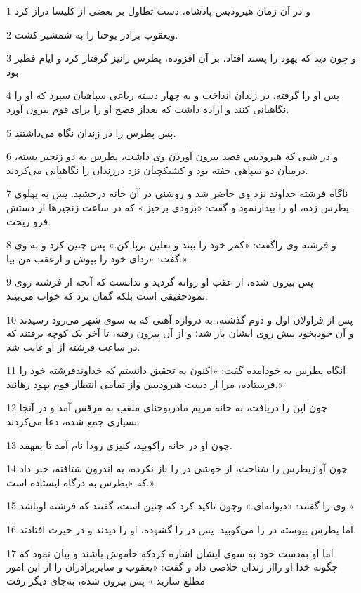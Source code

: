 \par 1 و در آن زمان هیرودیس پادشاه، دست تطاول بر بعضی از کلیسا دراز کرد
\par 2 ویعقوب برادر یوحنا را به شمشیر کشت.
\par 3 و چون دید که یهود را پسند افتاد، بر آن افزوده، پطرس رانیز گرفتار کرد و ایام فطیر بود.
\par 4 پس او را گرفته، در زندان انداخت و به چهار دسته رباعی سپاهیان سپرد که او را نگاهبانی کنند و اراده داشت که بعداز فصح او را برای قوم بیرون آورد.
\par 5 پس پطرس را در زندان نگاه می‌داشتند.
\par 6 و در شبی که هیرودیس قصد بیرون آوردن وی داشت، پطرس به دو زنجیر بسته، درمیان دو سپاهی خفته بود و کشیکچیان نزد درزندان را نگاهبانی می‌کردند.
\par 7 ناگاه فرشته خداوند نزد وی حاضر شد و روشنی در آن خانه درخشید. پس به پهلوی پطرس زده، او را بیدارنمود و گفت: «بزودی برخیز.» که در ساعت زنجیرها از دستش فرو ریخت.
\par 8 و فرشته وی راگفت: «کمر خود را ببند و نعلین برپا کن.» پس چنین کرد و به وی گفت: «ردای خود را بپوش و ازعقب من بیا.»
\par 9 پس بیرون شده، از عقب او روانه گردید و ندانست که آنچه از فرشته روی نمودحقیقی است بلکه گمان برد که خواب می‌بیند.
\par 10 پس از قراولان اول و دوم گذشته، به دروازه آهنی که به سوی شهر می‌رود رسیدند و آن خودبخود پیش روی ایشان باز شد؛ و از آن بیرون رفته، تا آخر یک کوچه برفتند که در ساعت فرشته از او غایب شد.
\par 11 آنگاه پطرس به خودآمده گفت: «اکنون به تحقیق دانستم که خداوندفرشته خود را فرستاده، مرا از دست هیرودیس واز تمامی انتظار قوم یهود رهانید.»
\par 12 چون این را دریافت، به خانه مریم مادریوحنای ملقب به مرقس آمد و در آنجا بسیاری جمع شده، دعا می‌کردند.
\par 13 چون او در خانه راکوبید، کنیزی رودا نام آمد تا بفهمد.
\par 14 چون آوازپطرس را شناخت، از خوشی در را باز نکرده، به اندرون شتافته، خبر داد که «پطرس به درگاه ایستاده است.»
\par 15 وی را گفتند: «دیوانه‌ای.» وچون تاکید کرد که چنین است، گفتند که فرشته اوباشد.»
\par 16 اما پطرس پیوسته در را می‌کوبید. پس در را گشوده، او را دیدند و در حیرت افتادند.
\par 17 اما او به‌دست خود به سوی ایشان اشاره کردکه خاموش باشند و بیان نمود که چگونه خدا او رااز زندان خلاصی داد و گفت: «یعقوب و سایربرادران را از این امور مطلع سازید.» پس بیرون شده، به‌جای دیگر رفت
